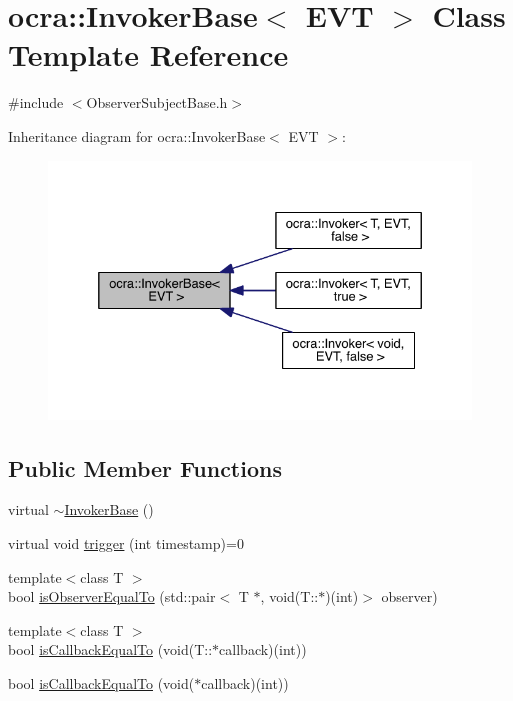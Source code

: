 \hypertarget{classocra_1_1InvokerBase}{}\section{ocra\+:\+:Invoker\+Base$<$ E\+VT $>$ Class Template Reference}
\label{classocra_1_1InvokerBase}


{\ttfamily \#include $<$Observer\+Subject\+Base.\+h$>$}



Inheritance diagram for ocra\+:\+:Invoker\+Base$<$ E\+VT $>$\+:\nopagebreak
\begin{figure}[H]
\begin{center}
\leavevmode
\includegraphics[width=332pt]{d8/dc5/classocra_1_1InvokerBase__inherit__graph}
\end{center}
\end{figure}
\subsection*{Public Member Functions}
\begin{DoxyCompactItemize}
\item 
virtual \hyperlink{classocra_1_1InvokerBase_aa02504b95fda47269f5c42c4c7650a13}{$\sim$\+Invoker\+Base} ()
\item 
virtual void \hyperlink{classocra_1_1InvokerBase_ae4d7537a1b2c0aa9b5188c5da8423289}{trigger} (int timestamp)=0
\end{DoxyCompactItemize}
{\bf }\par
\begin{DoxyCompactItemize}
\item 
{\footnotesize template$<$class T $>$ }\\bool \hyperlink{classocra_1_1InvokerBase_a1ba940e9b5c9559fd7904dda940d2501}{is\+Observer\+Equal\+To} (std\+::pair$<$ T $\ast$, void(T\+::$\ast$)(int)$>$ observer)
\item 
{\footnotesize template$<$class T $>$ }\\bool \hyperlink{classocra_1_1InvokerBase_a4876ec9f3321e19fda7eb7f40befdf8e}{is\+Callback\+Equal\+To} (void(T\+::$\ast$callback)(int))
\item 
bool \hyperlink{classocra_1_1InvokerBase_a89f5d1ce29dcec8811e41e1e5992350d}{is\+Callback\+Equal\+To} (void($\ast$callback)(int))
\end{DoxyCompactItemize}


